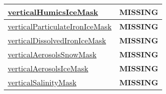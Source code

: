 {\begin{center}
\begin{longtable}{| p{2.0in} | p{4.0in} |}
    \hyperref[subsec:var_sec_tracer_masks_verticalHumicsIceMask]{verticalHumicsIceMask} & {\bf \color{red} MISSING} \\
    \hline
    \hyperref[subsec:var_sec_tracer_masks_verticalParticulateIronIceMask]{verticalParticulateIronIceMask} & {\bf \color{red} MISSING} \\
    \hline
    \hyperref[subsec:var_sec_tracer_masks_verticalDissolvedIronIceMask]{verticalDissolvedIronIceMask} & {\bf \color{red} MISSING} \\
    \hline
    \hyperref[subsec:var_sec_tracer_masks_verticalAerosolsSnowMask]{verticalAerosolsSnowMask} & {\bf \color{red} MISSING} \\
    \hline
    \hyperref[subsec:var_sec_tracer_masks_verticalAerosolsIceMask]{verticalAerosolsIceMask} & {\bf \color{red} MISSING} \\
    \hline
    \hyperref[subsec:var_sec_tracer_masks_verticalSalinityMask]{verticalSalinityMask} & {\bf \color{red} MISSING} \\
    \hline
\end{longtable}
\end{center}
}

